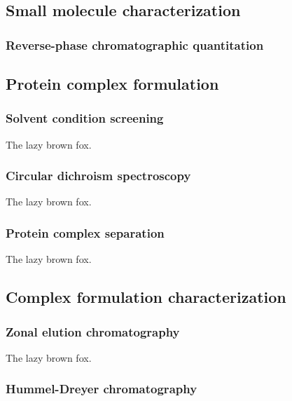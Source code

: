 \begin{refsection}
\subsection{Small molecule characterization}


\subsubsection{Reverse-phase chromatographic quantitation}



\subsection{Protein complex formulation}

\subsubsection{Solvent condition screening}

The lazy brown fox.

\subsubsection{Circular dichroism spectroscopy}

The lazy brown fox.

\subsubsection{Protein complex separation}

The lazy brown fox.

\subsection{Complex formulation characterization}

\subsubsection{Zonal elution chromatography}

The lazy brown fox.

\subsubsection{Hummel-Dreyer chromatography}


\end{refsection}

